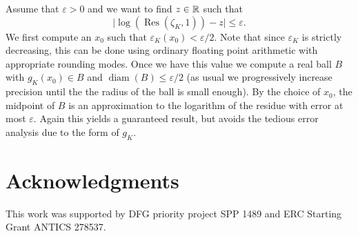 \documentclass{sig-alternate-05-2015}
\begin{document}
Assume that $\varepsilon > 0$ and we want to find $z \in \mathbb{R}$ such that
\[ \lvert \log(\operatorname{Res}(\zeta_K, 1)) - z \rvert \leq \varepsilon.\]
We first compute an $x_0$ such that $\varepsilon_K(x_0) < \varepsilon/2$. Note that since $\varepsilon_K$ is strictly decreasing,
this can be done using ordinary floating point arithmetic with appropriate rounding modes.
Once we have this value we compute a real ball $B$ with $g_K(x_0) \in B$ and $\operatorname{diam}(B) \leq \varepsilon/2$ (as usual
we progressively increase precision until the the radius of the ball is small enough).
By the choice of $x_0$, the midpoint of $B$ is an approximation to the logarithm of the residue with error at most $\varepsilon$.
Again this yields a guaranteed result, but avoids the tedious error analysis due to the form of $g_K$.

\section{Acknowledgments}

This work was supported by DFG priority project SPP 1489 and ERC Starting Grant ANTICS 278537.
\end{document}
